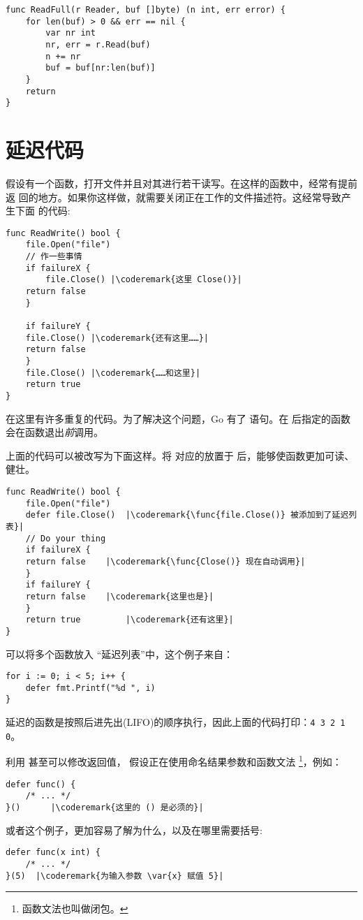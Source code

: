 \begin{lstlisting}
func ReadFull(r Reader, buf []byte) (n int, err error) {
    for len(buf) > 0 && err == nil {
        var nr int
        nr, err = r.Read(buf)
        n += nr
        buf = buf[nr:len(buf)]
    }
    return
}
\end{lstlisting}

\section{延迟代码}
\label{sec:deferred code}
假设有一个函数，打开文件并且对其进行若干读写。在这样的函数中，经常有提前返
回的地方。如果你这样做，就需要关闭正在工作的文件描述符。这经常导致产生下面
的代码:
\begin{lstlisting}[caption=没有 defer]
func ReadWrite() bool {
    file.Open("file")
    // 作一些事情
    if failureX {
        file.Close() |\coderemark{这里 Close()}|
	return false
    }

    if failureY {
	file.Close() |\coderemark{还有这里……}|
	return false
    }
    file.Close() |\coderemark{……和这里}|
    return true
}
\end{lstlisting}
在这里有许多重复的代码。为了解决这个问题，Go 有了 
 语句。在  
后指定的函数会在函数退出\emph{前}调用。

上面的代码可以被改写为下面这样。将  对应的放置于 
 后，能够使函数更加可读、健壮。
\begin{lstlisting}[caption=使用 defer]
func ReadWrite() bool {
    file.Open("file")
    defer file.Close()	|\coderemark{\func{file.Close()} 被添加到了延迟列表}|
    // Do your thing
    if failureX {
	return false    |\coderemark{\func{Close()} 现在自动调用}|
    }
    if failureY {
	return false    |\coderemark{这里也是}|
    }
    return true         |\coderemark{还有这里}|
}
\end{lstlisting}
可以将多个函数放入 “延迟列表”中，这个例子来自\cite{effective_go}：
\begin{lstlisting}
for i := 0; i < 5; i++ { 
    defer fmt.Printf("%d ", i) 
} 
\end{lstlisting}
延迟的函数是按照后进先出(LIFO)的顺序执行，因此上面的代码打印：\lstinline{4 3 2 1 0}。

利用  甚至可以修改返回值，
假设正在使用命名结果参数和函数文法
\footnote{函数文法也叫做闭包。}，例如：
\begin{lstlisting}[caption=函数文法]
defer func() {
	/* ... */
}()		 |\coderemark{这里的 () 是必须的}|
\end{lstlisting}
或者这个例子，更加容易了解为什么，以及在哪里需要括号:
\begin{lstlisting}[caption=带参数的函数文法]
defer func(x int) {
	/* ... */
}(5)  |\coderemark{为输入参数 \var{x} 赋值 5}|
\end{lstlisting}

